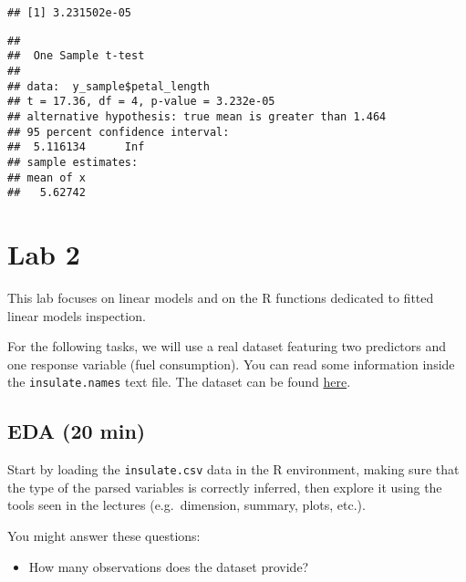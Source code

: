 \documentclass[
  oneside]{book}
\newenvironment{Shaded}{\begin{snugshade}}{\end{snugshade}}
\newcommand{\AttributeTok}[1]{\textcolor[rgb]{0.77,0.63,0.00}{#1}}
\newcommand{\CommentTok}[1]{\textcolor[rgb]{0.56,0.35,0.01}{\textit{#1}}}
\newcommand{\FunctionTok}[1]{\textcolor[rgb]{0.00,0.00,0.00}{#1}}
\newcommand{\NormalTok}[1]{#1}
\newcommand{\SpecialCharTok}[1]{\textcolor[rgb]{0.00,0.00,0.00}{#1}}
\newcommand{\StringTok}[1]{\textcolor[rgb]{0.31,0.60,0.02}{#1}}
\providecommand{\tightlist}{%
  \setlength{\itemsep}{0pt}\setlength{\parskip}{0pt}}
\begin{document}
\begin{verbatim}
## [1] 3.231502e-05
\end{verbatim}

\begin{Shaded}
\end{Shaded}

\begin{verbatim}
## 
##  One Sample t-test
## 
## data:  y_sample$petal_length
## t = 17.36, df = 4, p-value = 3.232e-05
## alternative hypothesis: true mean is greater than 1.464
## 95 percent confidence interval:
##  5.116134      Inf
## sample estimates:
## mean of x 
##   5.62742
\end{verbatim}

\hypertarget{lab-2}{%
\chapter{Lab 2}\label{lab-2}}

This lab focuses on linear models and on the R functions
dedicated to fitted linear models inspection.

For the following tasks, we will use a real dataset
featuring two predictors and one response variable (fuel consumption).
You can read some information inside the \texttt{insulate.names} text file.
The dataset can be found \href{https://github.com/toyo97/statistical-models-r/tree/master/datasets}{here}.

\hypertarget{eda-20-min}{%
\section{EDA (20 min)}\label{eda-20-min}}

Start by loading the \texttt{insulate.csv} data in the R environment,
making sure that the type of the parsed variables is correctly inferred,
then explore it using the tools seen in the lectures (e.g.~dimension,
summary, plots, etc.).

You might answer these questions:

\begin{itemize}
\tightlist
\item
  How many observations does the dataset provide?
\end{itemize}
\end{document}
